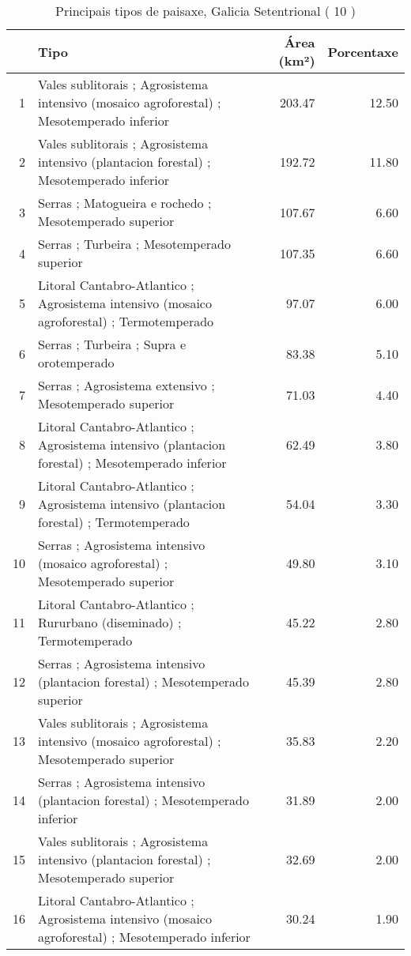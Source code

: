 \begin{table}[p]
\centering
\caption{Principais tipos de paisaxe,  Galicia Setentrional ( 10 )} 
\label{Tipos 10}
\begin{tabular}{rlrr}
  \hline
 & Tipo & Área (km²) & Porcentaxe \\ 
  \hline
1 & Vales sublitorais ; Agrosistema intensivo (mosaico agroforestal) ; Mesotemperado inferior & 203.47 & 12.50 \\ 
  2 & Vales sublitorais ; Agrosistema intensivo (plantacion forestal) ; Mesotemperado inferior & 192.72 & 11.80 \\ 
  3 & Serras ; Matogueira e rochedo ; Mesotemperado superior & 107.67 & 6.60 \\ 
  4 & Serras ; Turbeira ; Mesotemperado superior & 107.35 & 6.60 \\ 
  5 & Litoral Cantabro-Atlantico ; Agrosistema intensivo (mosaico agroforestal) ; Termotemperado & 97.07 & 6.00 \\ 
  6 & Serras ; Turbeira ; Supra e orotemperado & 83.38 & 5.10 \\ 
  7 & Serras ; Agrosistema extensivo ; Mesotemperado superior & 71.03 & 4.40 \\ 
  8 & Litoral Cantabro-Atlantico ; Agrosistema intensivo (plantacion forestal) ; Mesotemperado inferior & 62.49 & 3.80 \\ 
  9 & Litoral Cantabro-Atlantico ; Agrosistema intensivo (plantacion forestal) ; Termotemperado & 54.04 & 3.30 \\ 
  10 & Serras ; Agrosistema intensivo (mosaico agroforestal) ; Mesotemperado superior & 49.80 & 3.10 \\ 
  11 & Litoral Cantabro-Atlantico ; Rururbano (diseminado) ; Termotemperado & 45.22 & 2.80 \\ 
  12 & Serras ; Agrosistema intensivo (plantacion forestal) ; Mesotemperado superior & 45.39 & 2.80 \\ 
  13 & Vales sublitorais ; Agrosistema intensivo (mosaico agroforestal) ; Mesotemperado superior & 35.83 & 2.20 \\ 
  14 & Serras ; Agrosistema intensivo (plantacion forestal) ; Mesotemperado inferior & 31.89 & 2.00 \\ 
  15 & Vales sublitorais ; Agrosistema intensivo (plantacion forestal) ; Mesotemperado superior & 32.69 & 2.00 \\ 
  16 & Litoral Cantabro-Atlantico ; Agrosistema intensivo (mosaico agroforestal) ; Mesotemperado inferior & 30.24 & 1.90 \\ 

\end{tabular}
\end{table}
